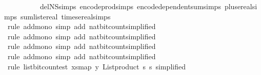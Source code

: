 \begin{isabellebody}
\ \ \ \ \ \ \ \ \ \ del{\isacharcolon}{\kern0pt}N\isactrlsub S{\isachardot}{\kern0pt}simps\ encode{\isacharunderscore}{\kern0pt}prod{\isachardot}{\kern0pt}simps\ encode{\isacharunderscore}{\kern0pt}dependent{\isacharunderscore}{\kern0pt}sum{\isachardot}{\kern0pt}simps\ plus{\isacharunderscore}{\kern0pt}ereal{\isachardot}{\kern0pt}simps\ sum{\isacharunderscore}{\kern0pt}list{\isacharunderscore}{\kern0pt}ereal\ times{\isacharunderscore}{\kern0pt}ereal{\isachardot}{\kern0pt}simps{\isacharparenright}{\kern0pt}\isanewline
\ \ \ \ \ \ \isamarkupfalse%
\ {\isacharparenleft}{\kern0pt}rule\ add{\isacharunderscore}{\kern0pt}mono{\isacharcomma}{\kern0pt}\ simp\ add{\isacharcolon}{\kern0pt}\ nat{\isacharunderscore}{\kern0pt}bit{\isacharunderscore}{\kern0pt}count{\isacharbrackleft}{\kern0pt}simplified{\isacharbrackright}{\kern0pt}{\isacharparenright}{\kern0pt}\isanewline
\ \ \ \ \ \ \isamarkupfalse%
\ {\isacharparenleft}{\kern0pt}rule\ add{\isacharunderscore}{\kern0pt}mono{\isacharcomma}{\kern0pt}\ simp\ add{\isacharcolon}{\kern0pt}\ nat{\isacharunderscore}{\kern0pt}bit{\isacharunderscore}{\kern0pt}count{\isacharbrackleft}{\kern0pt}simplified{\isacharbrackright}{\kern0pt}{\isacharparenright}{\kern0pt}\isanewline
\ \ \ \ \ \ \isamarkupfalse%
\ {\isacharparenleft}{\kern0pt}rule\ add{\isacharunderscore}{\kern0pt}mono{\isacharcomma}{\kern0pt}\ simp\ add{\isacharcolon}{\kern0pt}\ nat{\isacharunderscore}{\kern0pt}bit{\isacharunderscore}{\kern0pt}count{\isacharbrackleft}{\kern0pt}simplified{\isacharbrackright}{\kern0pt}{\isacharparenright}{\kern0pt}\isanewline
\ \ \ \ \ \ \isamarkupfalse%
\ {\isacharparenleft}{\kern0pt}rule\ add{\isacharunderscore}{\kern0pt}mono{\isacharcomma}{\kern0pt}\ simp\ add{\isacharcolon}{\kern0pt}\ nat{\isacharunderscore}{\kern0pt}bit{\isacharunderscore}{\kern0pt}count{\isacharbrackleft}{\kern0pt}simplified{\isacharbrackright}{\kern0pt}{\isacharparenright}{\kern0pt}\isanewline
\ \ \ \ \ \ \isamarkupfalse%
\ {\isacharparenleft}{\kern0pt}rule\ list{\isacharunderscore}{\kern0pt}bit{\isacharunderscore}{\kern0pt}count{\isacharunderscore}{\kern0pt}est{\isacharbrackleft}{\kern0pt}\ xs{\isacharequal}{\kern0pt}{\isachardoublequoteopen}map\ y\ {\isacharparenleft}{\kern0pt}List{\isachardot}{\kern0pt}product\ {\isacharbrackleft}{\kern0pt}{}{\isachardot}{\kern0pt}{\isachardot}{\kern0pt}{\isacharless}{\kern0pt}s\ {\isacharbrackleft}{\kern0pt}{}{\isachardot}{\kern0pt}{\isachardot}{\kern0pt}{\isacharless}{\kern0pt}s\ simplified{\isacharbrackright}{\kern0pt}{\isacharparenright}{\kern0pt}\isanewline

\end{isabellebody}
